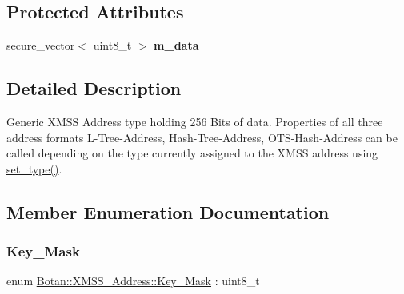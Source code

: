 \subsection*{Protected Attributes}
\begin{DoxyCompactItemize}
\item 
\mbox{\label{class_botan_1_1_x_m_s_s___address_a19bf13b793e3da15e9aa07fa00594a00}} 
secure\+\_\+vector$<$ uint8\+\_\+t $>$ {\bfseries m\+\_\+data}
\end{DoxyCompactItemize}


\subsection{Detailed Description}
Generic X\+M\+SS Address type holding 256 Bits of data. Properties of all three address formats L-\/\+Tree-\/\+Address, Hash-\/\+Tree-\/\+Address, O\+T\+S-\/\+Hash-\/\+Address can be called depending on the type currently assigned to the X\+M\+SS address using \hyperlink{class_botan_1_1_x_m_s_s___address_a57148e8e415efce53531406607526236}{set\+\_\+type()}. 

\subsection{Member Enumeration Documentation}
\mbox{\label{class_botan_1_1_x_m_s_s___address_a85146c0c3e049f62c413194049f501e3}} 
\subsubsection{\texorpdfstring{Key\+\_\+\+Mask}{Key\_Mask}}
{\footnotesize\ttfamily enum \hyperlink{class_botan_1_1_x_m_s_s___address_a85146c0c3e049f62c413194049f501e3}{Botan\+::\+X\+M\+S\+S\+\_\+\+Address\+::\+Key\+\_\+\+Mask} \+: uint8\+\_\+t\hspace{0.3cm}{\ttfamily [strong]}}

